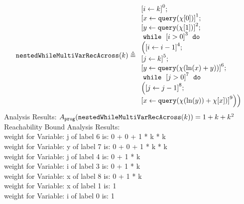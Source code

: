                             \begin{example}
                                \label{ex:nestedWhileMultiVarRecAcross}
                                \[
                                \kw{nestedWhileMultiVarRecAcross}(k) \triangleq 
                                \begin{array}{l}
                                    \clabel{\assign{i}{k} }^{0} ; \\
                                    \clabel{ \assign{x}{\query(\chi[0])}}^{1} ; \\
                                    \clabel{ \assign{y}{\query(\chi[1])}}^{2} ; \\
                                        \ewhile ~ \clabel{i > 0}^{3} ~ \edo ~ \\
                                        \Big(
                                         \clabel{\assign{i}{i-1}}^{4} ;\\
                                         \clabel{\assign{j}{k}}^{5} ;\\
                                         \clabel{\assign{y}{\query(\chi(\ln(x) + y))} }^{6}  ; \\
                                         \ewhile ~ \clabel{j > 0}^{7} ~ \edo ~ \\
                                         \Big(
                                          \clabel{\assign{j}{j-1}}^{8};\\
                                          \clabel{\assign{x}{\query(\chi(\ln(y))+\chi[x])} }^{9}
                                          \Big) \Big)
                                    \end{array}
                                \]
                                Analysis Results: 
                                $ A_{\mathtt{prog}}(\mathtt{nestedWhileMultiVarRecAcross}(k)) = 1 + k + k^2$
                                \\
                                Reachability Bound Analysis Results: \\
                                weight for Variable: j of label 6 is: 0 + 0 + 1 * k * k\\
                                weight for Variable: y of label 7 is: 0 + 0 + 1 * k * k\\
                                weight for Variable: j of label 4 is: 0 + 1 * k\\
                                weight for Variable: i of label 3 is: 0 + 1 * k\\
                                weight for Variable: x of label 8 is: 0 + 1 * k\\
                                weight for Variable: x of label 1 is: 1\\
                                weight for Variable: i of label 0 is: 1\\
                                \end{example}
                        

